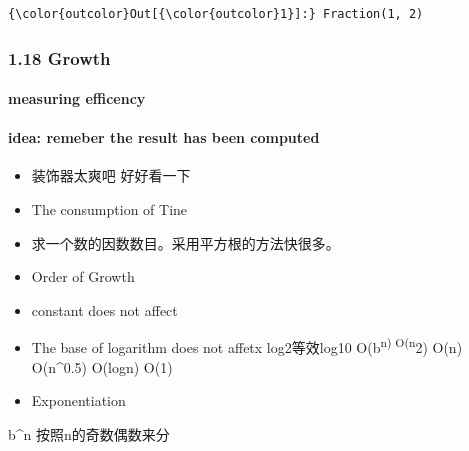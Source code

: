 \documentclass[11pt]{article}
\providecommand{\tightlist}{%
      \setlength{\itemsep}{0pt}\setlength{\parskip}{0pt}}
\begin{document}
\begin{Verbatim}[commandchars=\\\{\}]
{\color{outcolor}Out[{\color{outcolor}1}]:} Fraction(1, 2)
\end{Verbatim}
            
    \subsubsection{1.18 Growth}\label{growth}

\paragraph{measuring efficency}\label{measuring-efficency}

\paragraph{idea: remeber the result has been
computed}\label{idea-remeber-the-result-has-been-computed}

\begin{itemize}
\tightlist
\item
  装饰器太爽吧 好好看一下
\item
  The consumption of Tine
\item
  求一个数的因数数目。采用平方根的方法快很多。
\item
  Order of Growth
\item
  constant does not affect
\item
  The base of logarithm does not affetx log2等效log10
  O(b\textsuperscript{n) O(n}2) O(n) O(n\^{}0.5) O(logn) O(1)
\item
  Exponentiation
\end{itemize}

b\^{}n 按照n的奇数偶数来分
\end{document}
